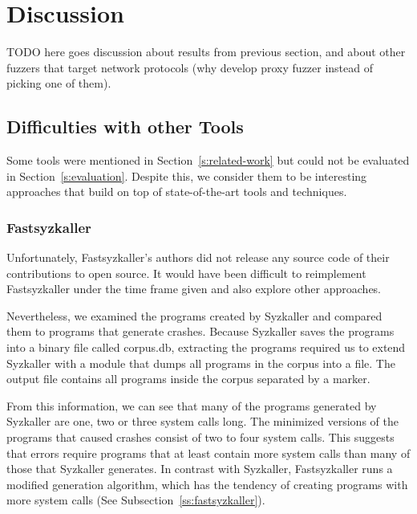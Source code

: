 \section{Discussion}

TODO here goes discussion about results from previous section, and about other fuzzers that target network protocols
(why develop proxy fuzzer instead of picking one of them).

\subsection{Difficulties with other Tools}

Some tools were mentioned in Section~\ref{s:related-work} but could not be evaluated in Section~\ref{s:evaluation}.
Despite this, we consider them to be interesting approaches that build on top of state-of-the-art tools and techniques.

\subsubsection{Fastsyzkaller}

Unfortunately, Fastsyzkaller's authors did not release any source code of their contributions to open source.
It would have been difficult to reimplement Fastsyzkaller under the time frame given and also explore
other approaches.

Nevertheless, we examined the programs created by Syzkaller and compared them to programs that generate crashes.
Because Syzkaller saves the programs into a binary file called corpus.db,  extracting the programs required us
to extend Syzkaller with a module that dumps all programs in the corpus into a file. The output file contains
all programs inside the corpus separated by a marker.

From this information, we can see that many of the programs generated by Syzkaller are one, two or three system calls long.
The minimized versions of the programs that caused crashes consist of two to four system calls. This suggests
that errors require programs that at least contain more system calls than many of those that Syzkaller generates.
In contrast with Syzkaller, Fastsyzkaller runs a modified generation algorithm, which has the tendency of creating programs
with more system calls (See Subsection~\ref{ss:fastsyzkaller}).

